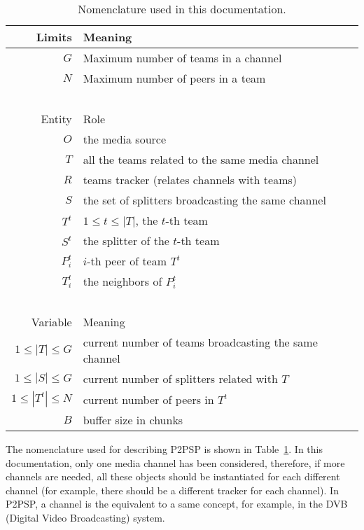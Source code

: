 \begin{table}
  \begin{tabular}{rl}
    Limits   & Meaning \\
    \hline
    $G$     & Maximum number of teams in a channel \\
    $N$     & Maximum number of peers in a team \\
    ~\\
    Entity  & Role \\
    \hline
    $O$     & the media source \\
    $T$     & all the teams related to the same media channel \\
    $R$     & teams tracker (relates channels with teams)\\
    $S$     & the set of splitters broadcasting the same channel \\
    $T^t$   & $1\leq t\leq |T|$, the $t$-th team \\
    $S^t$   & the splitter of the $t$-th team \\
    $P^t_i$ & $i$-th peer of team $T^t$ \\
    $T^t_i$ & the neighbors of $P^t_i$ \\
    ~\\
    Variable & Meaning \\
    \hline
    $1\leq |T|\leq G$   & current number of teams broadcasting the same channel \\
    $1\leq |S|\leq G$ & current number of splitters related with $T$ \\
    $1\leq |T^t|\leq N$ & current number of peers in $T^t$ \\
    $B$     & buffer size in chunks \\
  \end{tabular}
  \caption{Nomenclature used in this
    documentation.\label{tab:nomenclature}}
\end{table}

The nomenclature used for describing P2PSP is shown in
Table~\ref{tab:nomenclature}. In this documentation, only one media
channel has been considered, therefore, if more channels are needed,
all these objects should be instantiated for each different channel
(for example, there should be a different tracker for each
channel). In P2PSP, a channel is the equivalent to a same concept, for
example, in the DVB (Digital Video Broadcasting) system.
